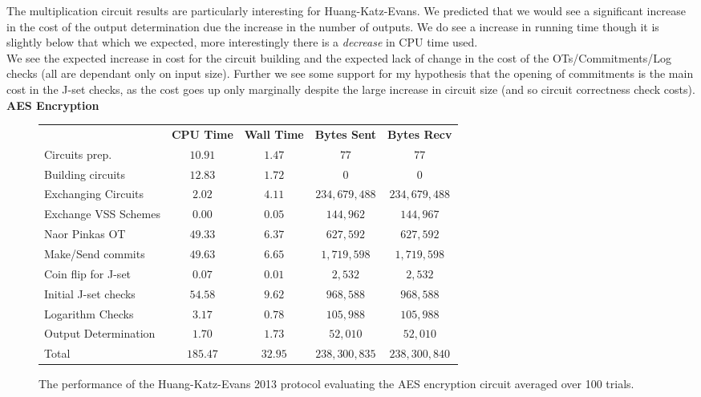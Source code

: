 \documentclass[ %
                    author={Nicholas Tutte},
                supervisor={Prof. Nigel Smart},
                    degree={MEng},
                     title={Secure Two Party Computation},
                  subtitle={A practical comparison of recent protocols},
                      type={Research - GG1K},
                      year={2015} ]{dissertation}
\begin{document}
				The multiplication circuit results are particularly interesting for Huang-Katz-Evans. We predicted that we would see a significant increase in the cost of the output determination due the increase in the number of outputs. We do see a increase in running time though it is slightly below that which we expected, more interestingly there is a \emph{decrease} in CPU time used.\\

				We see the expected increase in cost for the circuit building and the expected lack of change in the cost of the OTs/Commitments/Log checks (all are dependant only on input size). Further we see some support for my hypothesis that the opening of commitments is the main cost in the J-set checks, as the cost goes up only marginally despite the large increase in circuit size (and so circuit correctness check costs).\\

				\FloatBarrier
				\noindent \textbf{AES Encryption}
				\begin{figure}[!ht]
					\begin{tabular}{| p{4.3cm} | c c c c |}
						\hline
						& \textbf{CPU Time} & \textbf{Wall Time} & \textbf{Bytes Sent} & \textbf{Bytes Recv} \\
						\thickhline
						Circuits prep. & $10.91$ & $1.47$ & $77$ & $77$ \\
						\hline
						Building circuits & $12.83$ & $1.72$ & $0$ & $0$ \\
						\hline
						Exchanging Circuits & $2.02$ & $4.11$ & $234,679,488$ & $234,679,488$ \\
						\hline
						Exchange VSS Schemes & $0.00$ & $0.05$ & $144,962$ & $144,967$ \\
						\hline
						Naor Pinkas OT & $49.33$ & $6.37$ & $627,592$ & $627,592$ \\
						\hline
						Make/Send commits & $49.63$ & $6.65$ & $1,719,598$ & $1,719,598$ \\
						\hline
						Coin flip for J-set & $0.07$ & $0.01$ & $2,532$ & $2,532$ \\
						\hline
						Initial J-set checks & $54.58$ & $9.62$ & $968,588$ & $968,588$ \\
						\hline
						Logarithm Checks & $3.17$ & $0.78$ & $105,988$ & $105,988$ \\
						\hline
						Output Determination & $1.70$ & $1.73$ & $52,010$ & $52,010$ \\
						\thickhline
						Total & $185.47$ & $32.95$ & $238,300,835$ & $238,300,840$ \\
						\hline
					\end{tabular}
					\caption{The performance of the Huang-Katz-Evans 2013 protocol evaluating the AES encryption circuit averaged over 100 trials.\label{table:HKE_2013_AES}}
				\end{figure}
\end{document}
